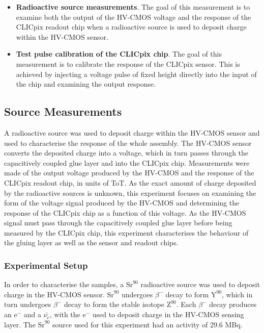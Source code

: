 \begin{itemize}
\item \textbf{Radioactive source measurements}.  The goal of this measurement is to examine both the output of the HV-CMOS voltage and the response of the CLICpix readout chip when a radioactive source is used to deposit charge within the HV-CMOS sensor.  
\item \textbf{Test pulse calibration of the CLICpix chip}.  The goal of this measurement is to calibrate the response of the CLICpix sensor.  This is achieved by injecting a voltage pulse of fixed height directly into the input of the chip and examining the output response.  
\end{itemize} 


\subsection{Source Measurements}
A radioactive source was used to deposit charge within the HV-CMOS sensor and used to characterise the response of the whole assembly.  The HV-CMOS sensor converts the deposited charge into a voltage, which in turn passes through the capacitively coupled glue layer and into the CLICpix chip.  Measurements were made of the output voltage produced by the HV-CMOS and the response of the CLICpix readout chip, in units of ToT.  As the exact amount of charge deposited by the radioactive sources is unknown, this experiment focuses on examining the form of the voltage signal produced by the HV-CMOS and determining the response of the CLICpix chip as a function of this voltage.  As the HV-CMOS signal must pass through the capacitively coupled glue layer before being measured by the CLICpix chip, this experiment characterises the behaviour of the gluing layer as well as the sensor and readout chips.


\subsubsection{Experimental Setup}
In order to characterise the samples, a $\text{Sr}^{90}$ radioactive source was used to deposit charge in the HV-CMOS sensor. $\text{Sr}^{90}$ undergoes $\beta^{-}$ decay to form $\text{Y}^{90}$, which in turn undergoes $\beta^{-}$ decay to form the stable isotope $\text{Z}^{90}$.  Each $\beta^{-}$ decay produces an $\text{e}^{-}$ and a $\bar{\nu_{e}}$, with the $\text{e}^{-}$ used to deposit charge in the HV-CMOS sensing layer.  The $\text{Sr}^{90}$ source used for this experiment had an activity of 29.6 MBq.  

